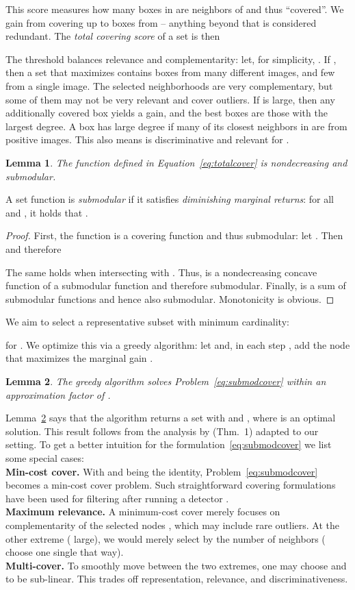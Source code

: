 \documentclass{article}
\newtheorem{lemma}{Lemma}
\begin{document}
This score measures how many boxes in  are neighbors of  and thus ``covered''. We gain from covering up to  boxes from  -- anything beyond that is considered redundant.
The \emph{total covering score} of a set  is then 

The threshold  balances relevance and complementarity: let, for simplicity, . If , then a set that maximizes  contains boxes from many different images, and few from a single image. The selected neighborhoods are very complementary, but some of them may not be very relevant and cover outliers. If  is large, then any additionally covered box yields a gain, and the best boxes  are those with the largest degree. A box has large degree if many of its closest neighbors in  are from positive images. This also means  is discriminative and relevant for .
\begin{lemma}
  The function  defined in Equation~\eqref{eq:totalcover} is nondecreasing and submodular.
\end{lemma}
A set function is \emph{submodular} if it satisfies \emph{diminishing marginal returns}: for all  and , it holds that .
\vspace{-5pt}
\begin{proof}
  First, the function  is a covering function and thus submodular: let . Then  and therefore
  
  The same holds when intersecting with .
Thus,  is a nondecreasing concave function of a submodular function and therefore submodular. Finally,  is a sum of submodular functions and hence also submodular. Monotonicity is obvious.
\end{proof}

We aim to select a representative subset  with minimum cardinality:

for . We optimize this via a greedy algorithm: let  and, in each step , add the node  that maximizes the marginal gain .
\begin{lemma}
  \label{lem:bound}
  The greedy algorithm solves Problem~\eqref{eq:submodcover} within an approximation factor of 
  .
\end{lemma}
Lemma~\ref{lem:bound} says that the algorithm returns a set  with  and , where  is an optimal solution.
This result follows from the analysis by \citet{wolsey82} (Thm.~1) adapted to our setting.
To get a better intuition for the formulation~\eqref{eq:submodcover} we list some special cases:\\
\textbf{Min-cost cover.} With  and  being the identity, Problem~\ref{eq:submodcover} becomes a min-cost cover problem. Such straightforward covering formulations have been used for filtering after running a detector \cite{barinova12}.\\
\textbf{Maximum relevance.} A minimum-cost cover merely focuses on complementarity of the selected nodes , which may include rare outliers. At the other extreme ( large), we would merely select by the number of neighbors (\citet{discovery1} choose one single  that way).\\
\textbf{Multi-cover.} To smoothly move between the two extremes, one may choose  and  to be sub-linear. This trades off representation, relevance, and discriminativeness.
\end{document}
